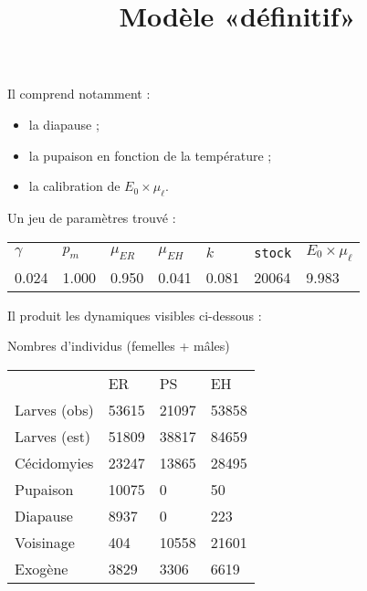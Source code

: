 \documentclass[a4paper, 11pt]{article}
\title{Modèle «définitif»}
\author{}
\date{}
\begin{document}
 \maketitle

 Il comprend notamment :
 \begin{itemize}
  \item la diapause ;
  \item la pupaison en fonction de la température ;
  \item la calibration de $E_0 \times \mu_\ell$.
 \end{itemize}

Un jeu de paramètres trouvé :

\begin{center}
\begin{tabular}{lllllll}
$\gamma$ & $p_m$ & $\mu_{ER}$ & $\mu_{EH}$ & $k$ & \texttt{stock} & $E_0\times \mu_\ell$\\
0.024 & 1.000 & 0.950 & 0.041 & 0.081 & 20064 & 9.983
\end{tabular}
\end{center}

Il produit les dynamiques visibles ci-dessous :
\begin{figure}[ht]
 \centering
\end{figure}

Nombres d'individus (femelles + mâles)
\begin{center}
\begin{tabular}{llll}
 & ER & PS & EH\\
Larves (obs) & 53615 & 21097 & 53858\\
Larves (est) & 51809 & 38817 & 84659\\
Cécidomyies & 23247 & 13865 & 28495\\
Pupaison & 10075 & 0 & 50\\
Diapause & 8937 & 0 & 223\\
Voisinage & 404 & 10558 & 21601\\
Exogène & 3829 & 3306 & 6619
\end{tabular}
\end{center}

 
\end{document}
